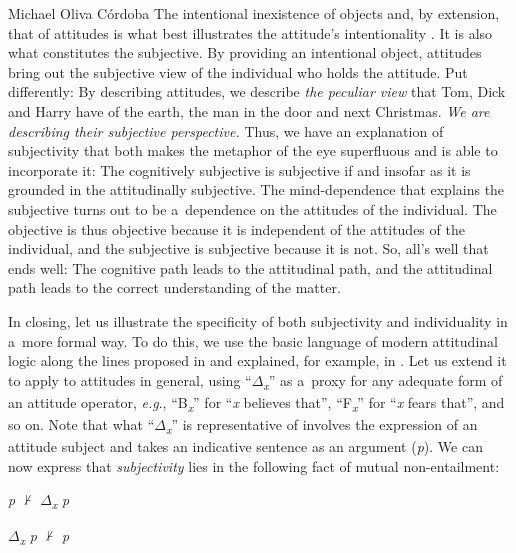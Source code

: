 \begin{artengenv}{Michael Oliva Córdoba}
The intentional inexistence of objects and, by extension, that of attitudes is what best illustrates the attitude's intentionality 
\parencite[cf.][p.xvi]{brentano_introduction_2009}. %
 It is also what constitutes the subjective. By providing an intentional object, attitudes bring out the subjective view of the individual who holds the attitude. Put differently: By describing attitudes, we describe \textit{the peculiar view} that Tom, Dick and Harry have of the earth, the man in the door and next Christmas. \textit{We are describing their subjective perspective.} Thus, we have an explanation of subjectivity that both makes the metaphor of the eye superfluous and is able to incorporate it: The cognitively subjective is subjective if and insofar as it is grounded in the attitudinally subjective. The mind-dependence that explains the subjective turns out to be a~dependence on the attitudes of the individual. The objective is thus objective because it is independent of the attitudes of the individual, and the subjective is subjective because it is not. So, all's well that ends well: The cognitive path leads to the attitudinal path, and the attitudinal path leads to the correct understanding of the matter.



In closing, let us illustrate the specificity of both subjectivity and individuality in a~more formal way. To do this, we use the basic language of modern attitudinal logic along the lines proposed in 
\parencite[][]{hintikka_knowledge_1962} %
 and explained, for example, in 
\parencite[][p.7]{ditmarsch_handbook_2015}. %
 Let us extend it to apply to attitudes in general, using ``$\Delta $\textit{\textsubscript{x}}'' as a~proxy for any adequate form of an attitude operator, \textit{e.g}., ``B\textit{\textsubscript{x}}'' for ``\textit{x} believes that'', ``F\textit{\textsubscript{x}}'' for ``\textit{x} fears that'', and so on. Note that what ``$\Delta $\textit{\textsubscript{x}}'' is representative of involves the expression of an attitude subject and takes an indicative sentence as an argument (\textit{p}). We can now express that \textit{subjectivity} lies in the following fact of mutual non-entailment:
\vspace{-.07cm}

\begin{description}[font=\normalfont, labelindent=0pt, leftmargin=!, labelwidth=1cm]
  \item[(Subjectivity)]
  \item[(i)] \textit{p} ${\nvdash}$ $\Delta $\textit{\textsubscript{x}} \textit{p}
  \item[(ii)] $\Delta $\textit{\textsubscript{x}} \textit{p} ${\nvdash}$ \textit{p}
\end{description}


\end{artengenv}
